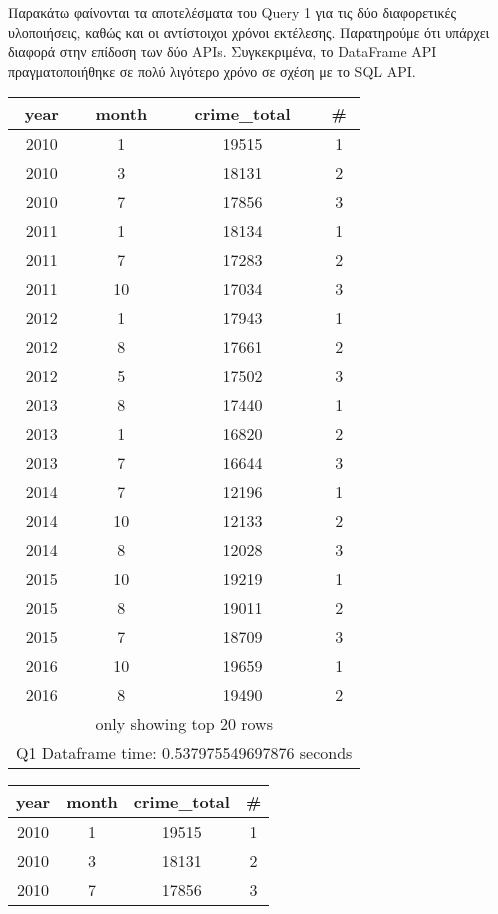 \documentclass{article}
\begin{document}
Παρακάτω φαίνονται τα αποτελέσματα του Query 1 για τις δύο διαφορετικές υλοποιήσεις, καθώς και οι αντίστοιχοι χρόνοι εκτέλεσης. Παρατηρούμε ότι υπάρχει διαφορά στην επίδοση των δύο APIs. Συγκεκριμένα, το DataFrame API πραγματοποιήθηκε σε πολύ λιγότερο χρόνο σε σχέση με το SQL API.

\begin{center} 
\noindent %
\begin{tabular}[t]{|c|c|c|c|}
\hline
\textbf{year} & \textbf{month} & \textbf{crime\_total} & \textbf{\#} \\
\hline
2010 & 1 & 19515 & 1 \\
2010 & 3 & 18131 & 2 \\
2010 & 7 & 17856 & 3 \\
2011 & 1 & 18134 & 1 \\
2011 & 7 & 17283 & 2 \\
2011 & 10 & 17034 & 3 \\
2012 & 1 & 17943 & 1 \\
2012 & 8 & 17661 & 2 \\
2012 & 5 & 17502 & 3 \\
2013 & 8 & 17440 & 1 \\
2013 & 1 & 16820 & 2 \\
2013 & 7 & 16644 & 3 \\
2014 & 7 & 12196 & 1 \\
2014 & 10 & 12133 & 2 \\
2014 & 8 & 12028 & 3 \\
2015 & 10 & 19219 & 1 \\
2015 & 8 & 19011 & 2 \\
2015 & 7 & 18709 & 3 \\
2016 & 10 & 19659 & 1 \\
2016 & 8 & 19490 & 2 \\
\hline
\multicolumn{4}{|c|}{only showing top 20 rows} \\
\hline
\multicolumn{4}{|c|}{Q1 Dataframe time: 0.537975549697876 seconds} \\
\hline
\end{tabular}
\hspace{10mm} %
\begin{tabular}[t]{|c|c|c|c|}
\hline
\textbf{year} & \textbf{month} & \textbf{crime\_total} & \textbf{\#} \\
\hline
2010 & 1 & 19515 & 1 \\
2010 & 3 & 18131 & 2 \\
2010 & 7 & 17856 & 3 \\

\end{tabular}
\end{center}
\end{document}
